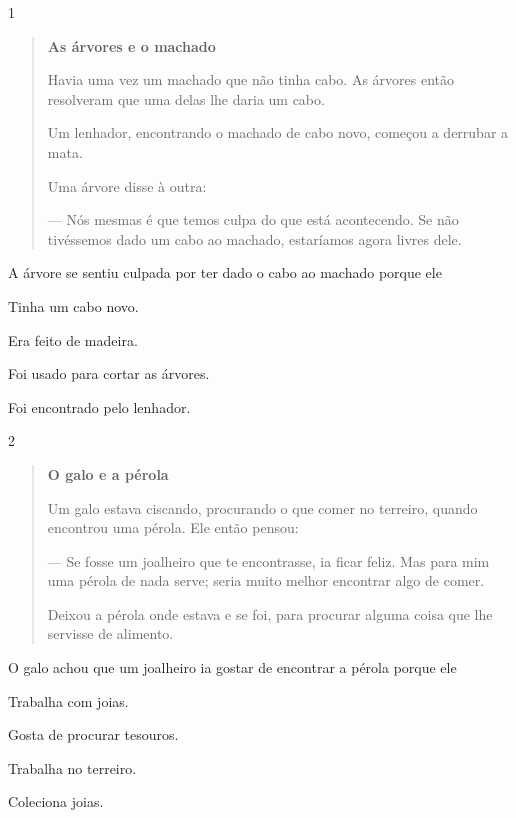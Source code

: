 
\num{1}

\begin{quote}
\textbf{As árvores e o machado}

Havia uma vez um machado que não tinha cabo.
As árvores então resolveram que uma delas lhe daria
um cabo.

Um lenhador, encontrando o machado de cabo novo,
começou a derrubar a mata.

Uma árvore disse à outra:

--- Nós mesmas é que temos culpa do que está
acontecendo. Se não tivéssemos dado um cabo ao machado,
estaríamos agora livres dele.

\end{quote}

A árvore se sentiu culpada por ter dado o cabo ao machado porque ele

\begin{escolha}
\item Tinha um cabo novo.

\item Era feito de madeira.

\item Foi usado para cortar as árvores.

\item Foi encontrado pelo lenhador.
\end{escolha}

\num{2}

\begin{quote}
\textbf{O galo e a pérola}

Um galo estava ciscando, procurando o que comer no terreiro,
quando encontrou uma pérola. Ele então pensou:

--- Se fosse um joalheiro que te encontrasse, ia ficar feliz.
Mas para mim uma pérola de nada serve; seria muito melhor
encontrar algo de comer.

Deixou a pérola onde estava e se foi, para procurar
alguma coisa que lhe servisse de alimento.

\end{quote}

O galo achou que um joalheiro ia gostar de encontrar a pérola porque ele

\begin{escolha}
\item Trabalha com joias.

\item Gosta de procurar tesouros.

\item Trabalha no terreiro.

\item Coleciona joias.
\end{escolha}



